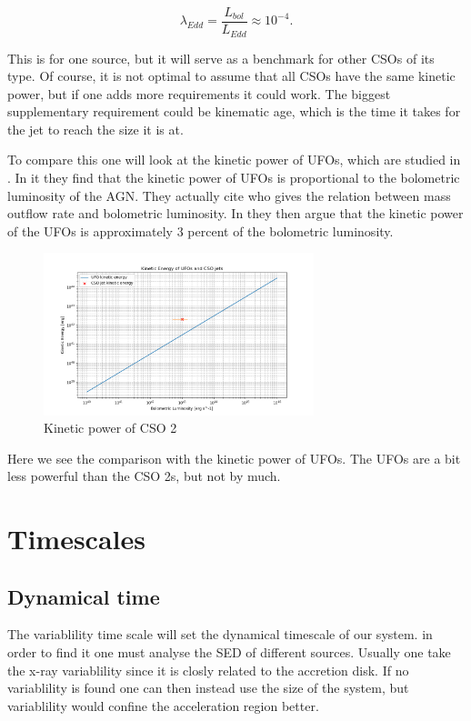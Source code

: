 \documentclass[11pt]{article}
\begin{document}
\begin{equation}
    \lambda_{Edd} = \frac{L_{bol}}{L_{Edd}} \approx 10^{-4}.
\end{equation}

This is for one source, but it will serve as a benchmark for other CSOs of its type. Of course, it is not optimal 
to assume that all CSOs have the same kinetic power, but if one adds more requirements it could work. The biggest supplementary 
requirement could be kinematic age, which is the time it takes for the jet to reach the size it is at. 

To compare this one will look at the kinetic power of UFOs, which are studied in \cite{peretti2023diffusive}. In it they find that the kinetic power of UFOs is
proportional to the bolometric luminosity of the AGN. They actually cite \cite{Fiore_2017} who gives the relation between mass outflow rate and bolometric luminosity. 
In \cite{peretti2023diffusive} they then argue that the kinetic power of the UFOs is approximately $3$ percent of the bolometric luminosity. 

\begin{figure}
    \centering
    \includegraphics[width=0.7\textwidth]{Plots/Kinetic_energy_UFO_CSO.png}
    \caption{Kinetic power of CSO 2}
    \label{fig:L_kin_cso}
\end{figure}
Here we see the comparison with the kinetic power of UFOs. The UFOs are a bit less powerful than the CSO 2s, but not by much.

\section*{Timescales}
\subsection*{Dynamical time}
The variablility time scale will set the dynamical timescale of our system. in order to find it one must 
analyse the SED of different sources. Usually one take the x-ray variablility since it is closly related to the 
accretion disk. If no variablility is found one can then instead use the size of the system, but variablility would confine the acceleration region better. 
\end{document}
